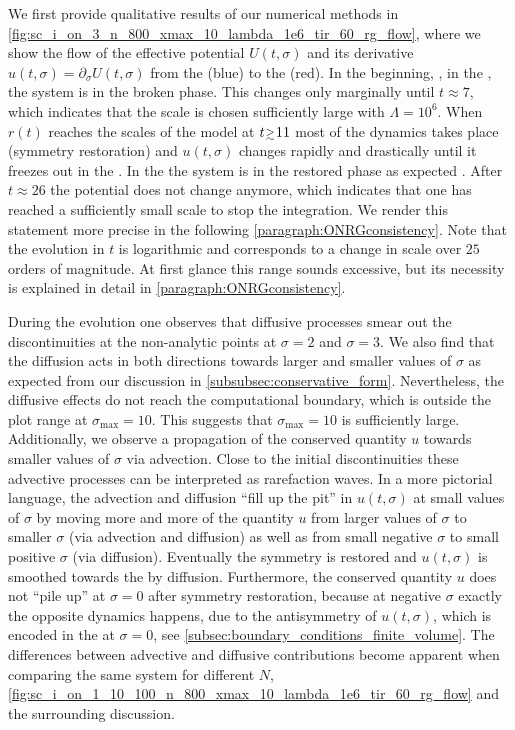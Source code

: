 We first provide qualitative results of our numerical methods in \cref{fig:sc_i_on_3_n_800_xmax_10_lambda_1e6_tir_60_rg_flow}, where we show the \frg{} flow of the effective potential $U ( t, \sigma )$ and its derivative $u ( t, \sigma ) = \partial_\sigma U ( t, \sigma )$ from the \uv{} (blue) to the \ir{} (red).
In the beginning, \ie{}, in the \uv{}, the system is in the broken phase. 
This changes only marginally until $t \approx 7$, which indicates that the \uv{} scale is chosen sufficiently large with $\Lambda = 10^6$.
When $r(t)$ reaches the scales of the model at $t \smallergtrsim 11$ most of the dynamics takes place (symmetry restoration) and $u ( t, \sigma )$ changes rapidly and drastically until it freezes out in the \ir{}.
In the \ir{} the system is in the restored phase as expected \apriori{}.
After $t \approx 26$ the potential does not change anymore, which indicates that one has reached a sufficiently small \ir{} scale to stop the integration.
We render this statement more precise in the following \cref{paragraph:ONRGconsistency}.
Note that the evolution in $t$ is logarithmic and corresponds to a change in scale over $25$ orders of magnitude.
At first glance this range sounds excessive, but its necessity is explained in detail in \cref{paragraph:ONRGconsistency}.

During the \frg{} evolution one observes that diffusive processes smear out the discontinuities at the non-analytic points at $\sigma = 2$ and $\sigma = 3$.
We also find that the diffusion acts in both directions \dash{} towards larger and smaller values of $\sigma$ \dash{} as expected from our discussion in \cref{subsubsec:conservative_form}. 
Nevertheless, the diffusive effects do not reach the computational boundary, which is outside the plot range at $\sigma_\mathrm{max} = 10$.
This suggests that $\sigma_\mathrm{max} = 10$ is sufficiently large.
Additionally, we observe a propagation of the conserved quantity $u$ towards smaller values of $\sigma$ via advection. 
Close to the initial discontinuities these advective processes can be interpreted as rarefaction waves. 
In a more pictorial language, the advection and diffusion ``fill up the pit'' in $u ( t, \sigma )$ at small values of $\sigma$ by moving more and more of the quantity $u$ from larger values of $\sigma$ to smaller $\sigma$ (via advection and diffusion) as well as from small negative $\sigma$ to small positive $\sigma$ (via diffusion).
Eventually the symmetry is restored and $u ( t, \sigma )$ is smoothed towards the \ir{} by diffusion. 
Furthermore, the conserved quantity $u$ does not ``pile up'' at $\sigma = 0$ after symmetry restoration, because at negative $\sigma$ exactly the opposite dynamics happens, due to the \ZII{} antisymmetry of $u ( t, \sigma )$, which is encoded in the \bc{} at $\sigma = 0$, see \cref{subsec:boundary_conditions_finite_volume}.
The differences between advective and diffusive contributions become apparent when comparing the same system for different $N$, \cf{} \cref{fig:sc_i_on_1_10_100_n_800_xmax_10_lambda_1e6_tir_60_rg_flow} and the surrounding discussion.

